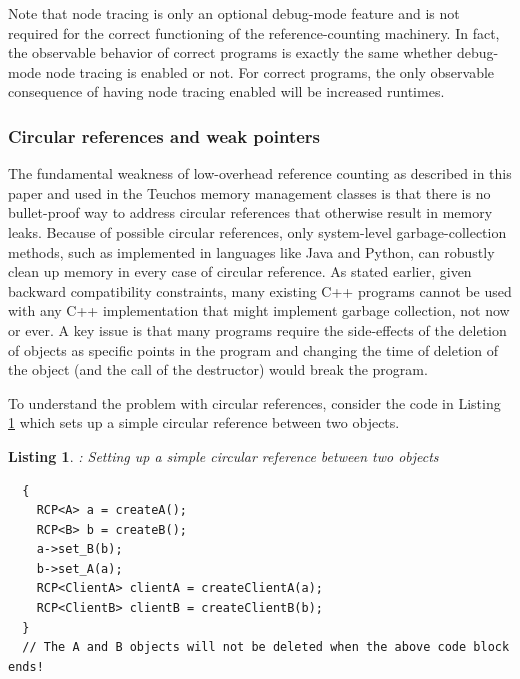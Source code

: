 \documentclass[pdf,ps2pdf,11pt]{SANDreport}
\newtheorem{listing}{Listing}
\begin{document}
Note that node tracing is only an optional debug-mode feature and is
not required for the correct functioning of the reference-counting
machinery.  In fact, the observable behavior of correct programs is
exactly the same whether debug-mode node tracing is enabled or not.
For correct programs, the only observable consequence of having node
tracing enabled will be increased runtimes.


%
{}\subsubsection{Circular references and weak pointers}
\label{sec:circular-references-weak-pointers}
%

The fundamental weakness of low-overhead reference counting as
described in this paper and used in the Teuchos memory management
classes is that there is no bullet-proof way to address circular
references that otherwise result in memory leaks.  Because of possible
circular references, only system-level garbage-collection methods,
such as implemented in languages like Java and Python, can robustly
clean up memory in every case of circular reference.  As stated
earlier, given backward compatibility constraints, many existing C++
programs cannot be used with any C++ implementation that might
implement garbage collection, not now or ever.  A key issue is that
many programs require the side-effects of the deletion of objects as
specific points in the program and changing the time of deletion of
the object (and the call of the destructor) would break the program.

To understand the problem with circular references, consider the code
in Listing {}\ref{listing:CircularRCP_A_B} which sets up a simple
circular reference between two objects.


\begin{listing}: Setting up a simple circular reference between two objects \\
\label{listing:CircularRCP_A_B}
{\small\begin{verbatim}
  {
    RCP<A> a = createA();
    RCP<B> b = createB();
    a->set_B(b);
    b->set_A(a);
    RCP<ClientA> clientA = createClientA(a);
    RCP<ClientB> clientB = createClientB(b);
  }
  // The A and B objects will not be deleted when the above code block ends!
\end{verbatim}}
\end{listing}
\end{document}
